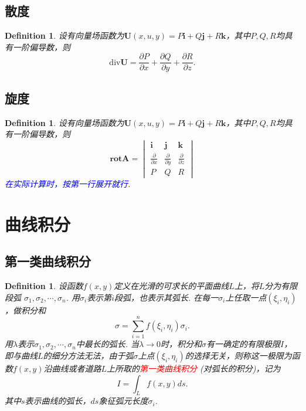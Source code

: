 \documentclass{article}
\newcommand{\mbf}[1]{\bm{#1}}
\newtheorem{definition}[theorem]{Definition}
\newcommand{\redt}[1]{\textcolor{red}{#1}}
\newcommand{\bluet}[1]{\textcolor{blue}{#1}}
\begin{document}
\subsection{散度}

\begin{definition}
\rm 设有向量场函数为$\mbf{U}(x,u,y)=P\mbf{i}+Q\mbf{j}+R\mbf{k}$，其中$P,Q,R$均具有一阶偏导数，则
$$
\text{div} \mbf{U} = \frac{\partial P}{\partial x} + \frac{\partial Q}{\partial y} + \frac{\partial R}{\partial z}.
$$
\end{definition}

\subsection{旋度}

\begin{definition}
\rm 设有向量场函数为$\mbf{U}(x,u,y)=P\mbf{i}+Q\mbf{j}+R\mbf{k}$，其中$P,Q,R$均具有一阶偏导数，则
$$
\textbf{rot}\mbf{A} = \begin{vmatrix}
\mbf{i} & \mbf{j} & \mbf{k} \\
\frac{\partial }{\partial x} & \frac{\partial }{\partial y} & \frac{\partial }{\partial z} \\
P & Q & R
\end{vmatrix}
$$
\bluet{在实际计算时，按第一行展开就行}. 
\end{definition}

\newpage
\section{曲线积分}

\subsection{第一类曲线积分}
\begin{definition}
\rm 设函数$f(x,y)$定义在光滑的可求长的平面曲线$L$上，将$L$分为有限段弧
$\sigma_1,\sigma_2,\cdots,\sigma_n$. 用$\sigma_i$表示第$i$段弧，也表示其弧长. 在每一$\sigma_i$上任取一点$(\xi_i,\eta_i)$，做积分和
$$
\sigma = \sum\limits_{i = 1}^n f(\xi_i,\eta_i)\sigma_i.
$$
用$\lambda$表示$\sigma_1,\sigma_2,\cdots,\sigma_n$中最长的弧长. 当$\lambda \to 0$时，积分和$\sigma$有一确定的有限极限$I$，即与曲线$L$的细分方法无法，由于弧$\sigma$上点$(\xi_i,\eta_i)$的选择无关，则称这一极限为函数$f(x,y)$沿曲线或者道路$L$上所取的\redt{第一类曲线积分}
(对弧长的积分)，记为
$$
I = \int_L f(x,y)ds. 
$$
其中$s$表示曲线的弧长，$ds$象征弧元长度$\sigma_i$.
\end{definition}
\end{document}
